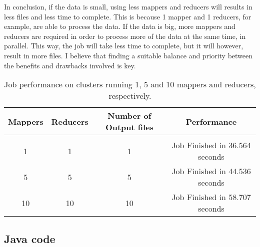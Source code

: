\documentclass{article} %
\begin{document}
In conclusion, if the data is small, using less mappers and reducers will results in less files and less time to complete. This is because 1 mapper and 1 reducers, for example, are able to process the data. If the data is big, more mappers and reducers are required in order to process more of the data at the same time, in parallel. This way, the job will take less time to complete, but it will however, result in more files. I believe that finding a suitable balance and priority between the benefits and drawbacks involved is key.

\begin{table}[!htbp]
\caption{Job performance on clusters running 1, 5 and 10 mappers and reducers, respectively.}
\label{table:2}
\begin{center}
\begin{tabular}{c c c c}
\multicolumn{1}{c}{\bf Mappers} & \multicolumn{1}{c}{\bf Reducers} & \multicolumn{1}{c}{\bf Number of Output files} & \multicolumn{1}{c}{\bf Performance}
\\ \hline \\
1 & 1 & 1 & Job Finished in 36.564 seconds\\
5 & 5 & 5 & Job Finished in 44.536 seconds\\
10 & 10 & 10 & Job Finished in 58.707 seconds

\end{tabular}
\end{center}
\end{table}

\subsection*{Java code} 
\end{document}

